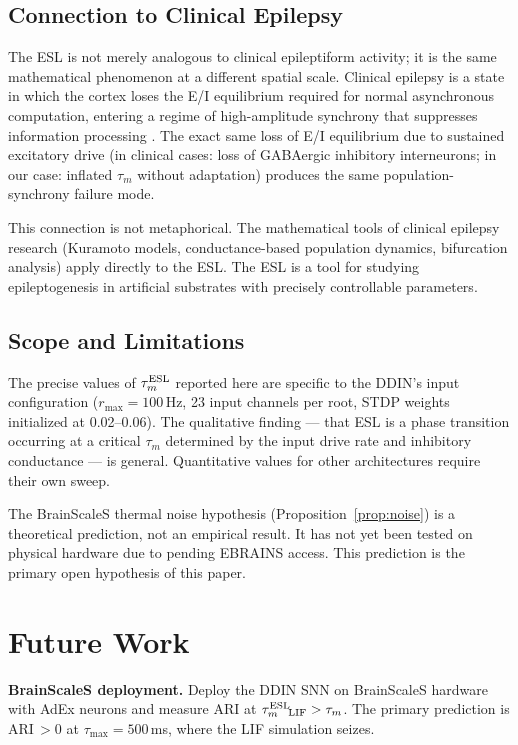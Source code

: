 \documentclass{article}
\begin{document}
\subsection{Connection to Clinical Epilepsy}

The ESL is not merely analogous to clinical epileptiform activity; it is the same mathematical phenomenon at a different spatial scale. Clinical epilepsy is a state in which the cortex loses the E/I equilibrium required for normal asynchronous computation, entering a regime of high-amplitude synchrony that suppresses information processing \citep{strogatz2000, jiruska2013}. The exact same loss of E/I equilibrium due to sustained excitatory drive (in clinical cases: loss of GABAergic inhibitory interneurons; in our case: inflated $\tau_m$ without adaptation) produces the same population-synchrony failure mode.

This connection is not metaphorical. The mathematical tools of clinical epilepsy research (Kuramoto models, conductance-based population dynamics, bifurcation analysis) apply directly to the ESL. The ESL is a tool for studying epileptogenesis in artificial substrates with precisely controllable parameters.

\subsection{Scope and Limitations}

The precise values of $\tau_m^{\rm ESL}$ reported here are specific to the DDIN's input configuration ($r_{\max} = 100$\,Hz, 23 input channels per root, STDP weights initialized at 0.02--0.06). The qualitative finding --- that ESL is a phase transition occurring at a critical $\tau_m$ determined by the input drive rate and inhibitory conductance --- is general. Quantitative values for other architectures require their own sweep.

The BrainScaleS thermal noise hypothesis (Proposition~\ref{prop:noise}) is a theoretical prediction, not an empirical result. It has not yet been tested on physical hardware due to pending EBRAINS access. This prediction is the primary open hypothesis of this paper.

\section{Future Work}

\textbf{BrainScaleS deployment.} Deploy the DDIN SNN on BrainScaleS hardware with AdEx neurons and measure ARI at $\tau_{m}^{\rm ESL}\!{}_{\rm LIF} > \tau_{m}$. The primary prediction is ARI\,$> 0$ at $\tau_{\max} = 500$\,ms, where the LIF simulation seizes.
\end{document}
